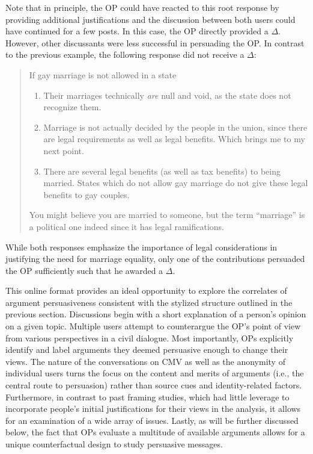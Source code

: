Note that in principle, the OP could have reacted to this root response by providing additional justifications and the discussion between both users could have continued for a few posts. In this case, the OP directly provided a $\Delta$. However, other discussants were less successful in persuading the OP. In contrast to the previous example, the following response did not receive a $\Delta$:
\begin{quote}\singlespacing
If gay marriage is not allowed in a state
\begin{enumerate}
\item Their marriages technically \textit{are} null and void, as the state does not recognize them.
\item Marriage is not actually decided by the people in the union, since there are legal requirements as well as legal benefits. Which brings me to my next point.
\item There are several legal benefits (as well as tax benefits) to being married. States which do not allow gay marriage do not give these legal benefits to gay couples.      
\end{enumerate}
You might believe you are married to someone, but the term ``marriage'' is a political one indeed since it has legal ramifications.
\end{quote}
While both responses emphasize the importance of legal considerations in justifying the need for marriage equality, only one of the contributions persuaded the OP sufficiently such that he awarded a $\Delta$. 

This online format provides an ideal opportunity to explore the correlates of argument persuasiveness consistent with the stylized structure outlined in the previous section. Discussions begin with a short explanation of a person's opinion on a given topic. Multiple users attempt to counterargue the OP's point of view from various perspectives in a civil dialogue. Most importantly, OPs explicitly identify and label arguments they deemed persuasive enough to change their views. The nature of the conversations on CMV as well as the anonymity of individual users turns the focus on the content and merits of arguments (i.e., the central route to persuasion) rather than source cues and identity-related factors. Furthermore, in contrast to past framing studies, which had little leverage to incorporate people's initial justifications for their views in the analysis, it allows for an examination of a wide array of issues. Lastly, as will be further discussed below, the fact that OPs evaluate a multitude of available arguments allows for a unique counterfactual design to study persuasive messages.

